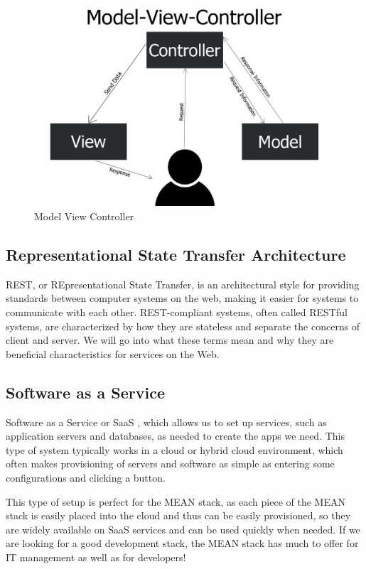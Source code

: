 \begin{figure}[!ht]
      \center
      \includegraphics[scale=0.30]{assets/mvc.jpg}
      \caption{Model View Controller}
      \label{fig:mvc}
\end{figure}
\subsection{Representational State Transfer Architecture}
REST, or REpresentational State Transfer, is an architectural style for providing standards between computer systems on the web, making it easier for systems to communicate with each other. REST-compliant systems, often called RESTful systems, are characterized by how they are stateless and separate the concerns of client and server. We will go into what these terms mean and why they are beneficial characteristics for services on the Web.
\subsection{Software as a Service}
Software as a Service or SaaS , which allows us to set up services, such as application servers and databases, as needed to create the apps we need. This type of system typically works in a cloud or hybrid cloud environment, which often makes provisioning of servers and software as simple as entering some configurations and clicking a button.

This type of setup is perfect for the MEAN stack, as each piece of the MEAN stack is easily placed into the cloud and thus can be easily provisioned, so they are widely available on SaaS services and can be used quickly when needed. If we are looking for a good development stack, the MEAN stack has much to offer for IT management as well as for developers!

